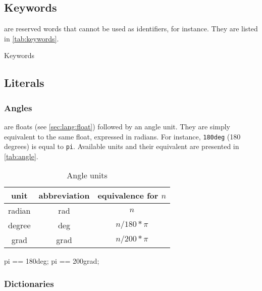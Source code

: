\subsection{Keywords}
\label{sec:lang:keywords}

 are reserved words that cannot be used as identifiers,
for instance.  They are listed in \autoref{tab:keywords}.

\renewcommand{\baselinestretch}{.85}
\begin{table}[\floatpos]
  \centering
  
  \caption{Keywords}
  \label{tab:keywords}
\end{table}
\renewcommand{\baselinestretch}{1}

\subsection{Literals}

\subsubsection{Angles}

 are floats (see \autoref{sec:lang:float}) followed by an
angle unit. They are simply equivalent to the same float, expressed in
radians. For instance, \lstinline|180deg| (180 degrees) is equal to
\lstinline{pi}. Available units and their equivalent are presented in
\autoref{tab:angle}.

\begin{table}[\floatposh]
  \centering
  \begin{tabular}{|c|c|c|}
    \hline
    unit        & abbreviation & equivalence for $n$  \\
    \hline
    radian      & rad          & $n$         \\
    degree      & deg          & $n / 180 * \pi$        \\
    grad        & grad         & $n / 200 * \pi$        \\
    \hline
  \end{tabular}
  \caption{Angle units}
  \label{tab:angle}
\end{table}

\begin{urbiassert}
pi == 180deg;
pi == 200grad;
\end{urbiassert}

\subsubsection{Dictionaries}
\label{sec:lang:dictionary}

